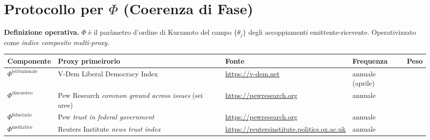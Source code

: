 \section{\texorpdfstring{Protocollo per \(\Phi\) (Coerenza di
Fase)}{Protocollo per \textbackslash Phi (Coerenza di Fase)}}\label{protocollo-per-phi-coerenza-di-fase}

\Hypoth{} \textbf{Definizione operativa.} \(\Phi\) è il parâmetro
d'ordine di Kuramoto del campo \(\{\theta_j\}\) degli accoppiamenti
emittente-ricevente. Operativizzato come \emph{indice composito
multi-proxy}.

{\def\LTcaptype{none} %
{\small\begin{longtable}[]{@{}
  >{\raggedright\arraybackslash}p{}
  >{\raggedright\arraybackslash}p{}
  >{\raggedright\arraybackslash}p{}
  >{\raggedright\arraybackslash}p{}
  >{\raggedright\arraybackslash}p{}@{}}
\toprule\noalign{}
\begin{minipage}[b]{\linewidth}\raggedright
Componente
\end{minipage} & \begin{minipage}[b]{\linewidth}\raggedright
Proxy primeirorio
\end{minipage} & \begin{minipage}[b]{\linewidth}\raggedright
Fonte
\end{minipage} & \begin{minipage}[b]{\linewidth}\raggedright
Frequenza
\end{minipage} & \begin{minipage}[b]{\linewidth}\raggedright
Peso
\end{minipage} \\
\midrule\noalign{}
\endhead
\bottomrule\noalign{}
\endlastfoot
\(\Phi^{\text{istituzionale}}\) & V-Dem Liberal Democracy Index &
\url{https://v-dem.net} & annuale (aprile) & 0.40 \\
\(\Phi^{\text{discorsivo}}\) & Pew Research \emph{common ground across
issues} (sei aree) & \url{https://pewresearch.org} & annuale & 0.25 \\
\(\Phi^{\text{fiduciario}}\) & Pew \emph{trust in federal government} &
\url{https://pewresearch.org} & annuale & 0.20 \\
\(\Phi^{\text{mediatico}}\) & Reuters Institute \emph{news trust index}
& \url{https://reutersinstitute.politics.ox.ac.uk} & annuale & 0.15 \\
\end{longtable}}
}

